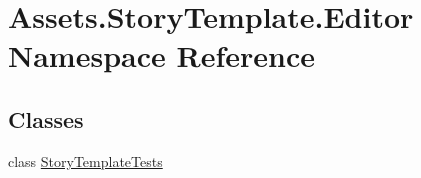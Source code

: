\hypertarget{namespaceAssets_1_1StoryTemplate_1_1Editor}{}\section{Assets.\+Story\+Template.\+Editor Namespace Reference}
\label{namespaceAssets_1_1StoryTemplate_1_1Editor}
\subsection*{Classes}
\begin{DoxyCompactItemize}
\item 
class \hyperlink{classAssets_1_1StoryTemplate_1_1Editor_1_1StoryTemplateTests}{Story\+Template\+Tests}
\end{DoxyCompactItemize}
